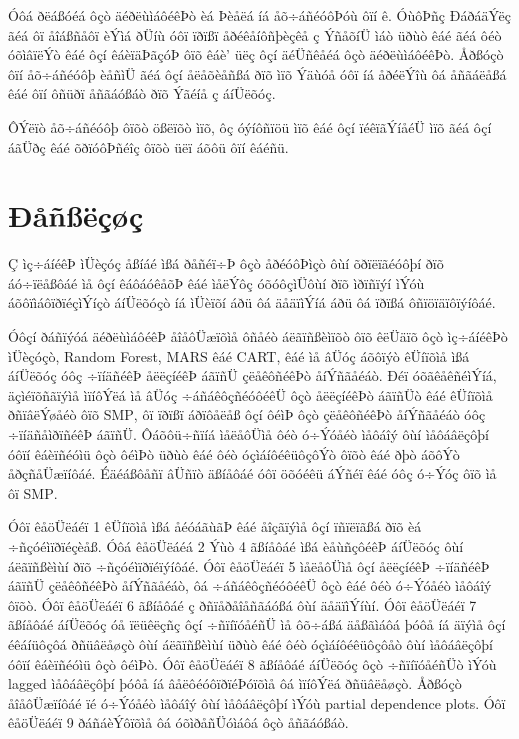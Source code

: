 \documentclass[12pt, twoside, a4paper]{book}
\newcommand{\tl}[1]{\textlatin{#1}}
\begin{document}
Óôá ðëáßóéá ôçò äéðëùìáôéêÞò èá Þèåëá íá åõ÷áñéóôÞóù ôïí ê. ÓùôÞñç ÐáðáäÝëç ãéá ôï åîáßñåôï èÝìá ðÜíù óôï ïðïßï åðéêåíôñþèçêå ç ÝñåõíÜ ìáò üðùò êáé ãéá ôéò óõìâïëÝò êáé ôçí êáèïäÞãçóÞ ôïõ êáè' üëç ôçí äéÜñêåéá ôçò äéðëùìáôéêÞò. Åðßóçò ôïí åõ÷áñéóôþ èåñìÜ ãéá ôçí åëåõèåñßá ðïõ ìïõ Ýäùóå óôï íá åðéëÝîù ôá åñãáëåßá êáé ôïí ôñüðï åñãáóßáò ðïõ Ýãéíå ç áíÜëõóç.

ÔÝëïò åõ÷áñéóôþ ôïõò ößëïõò ìïõ, ôç óýíôñïöü ìïõ êáé ôçí ïéêïãÝíåéÜ ìïõ ãéá ôçí áãÜðç êáé õðïóôÞñéîç ôïõò üëï áõôü ôïí êáéñü.

\newpage
\thispagestyle{empty}
\chapter*{Ðåñßëçøç}

Ç ìç÷áíéêÞ ìÜèçóç åßíáé ìßá ðåñéï÷Þ ôçò åðéóôÞìçò ôùí õðïëïãéóôþí ðïõ áó÷ïëåßôáé ìå ôçí êáôáóêåõÞ êáé ìåëÝôç óõóôçìÜôùí ðïõ ìðïñïýí ìÝóù áõôïìáôïðïéçìÝíçò áíÜëõóçò íá ìÜèïõí áðü ôá äåäïìÝíá áðü ôá ïðïßá ôñïöïäïôïýíôáé. 

Óôçí ðáñïýóá äéðëùìáôéêÞ åîåôÜæïõìå ôñåéò áëãïñßèìïõò ôïõ êëÜäïõ ôçò ìç÷áíéêÞò ìÜèçóçò, \tl{Random Forest}, \tl{MARS} êáé \tl{CART}, êáé ìå âÜóç áõôïýò êÜíïõìå ìßá áíÜëõóç óôç ÷ïíäñéêÞ åëëçíéêÞ áãïñÜ çëåêôñéêÞò åíÝñãåéáò. Ðéï óõãêåêñéìÝíá, äçìéïõñãïýìå ìïíôÝëá ìå âÜóç ÷áñáêôçñéóôéêÜ ôçò åëëçíéêÞò áãïñÜò êáé êÜíïõìå ðñïâëÝøåéò ôïõ \tl{SMP}, ôï ïðïßï áðïôåëåß ôçí ôéìÞ ôçò çëåêôñéêÞò åíÝñãåéáò óôç ÷ïíäñåìðïñéêÞ áãïñÜ. Ôáõôü÷ñïíá ìåëåôÜìå ôéò ó÷Ýóåéò ìåôáîý ôùí ìåôáâëçôþí óôïí êáèïñéóìü ôçò ôéìÞò üðùò êáé ôéò óçìáíôéêüôçôÝò ôïõò êáé ðþò áõôÝò åðçñåÜæïíôáé. Éäéáßôåñï âÜñïò äßíåôáé óôï öõóéêü áÝñéï êáé óôç ó÷Ýóç ôïõ ìå ôï \tl{SMP}.

Óôï êåöÜëáéï 1 êÜíïõìå ìßá åéóáãùãÞ êáé åîçãïýìå ôçí ïñïëïãßá ðïõ èá ÷ñçóéìïðïéçèåß. Óôá êåöÜëáéá 2 Ýùò 4 ãßíåôáé ìßá èåùñçôéêÞ áíÜëõóç ôùí áëãïñßèìùí ðïõ ÷ñçóéìïðïéïýíôáé. Óôï êåöÜëáéï 5 ìåëåôÜìå ôçí åëëçíéêÞ ÷ïíäñéêÞ áãïñÜ çëåêôñéêÞò åíÝñãåéáò, ôá ÷áñáêôçñéóôéêÜ ôçò êáé ôéò ó÷Ýóåéò ìåôáîý ôïõò. Óôï êåöÜëáéï 6 ãßíåôáé ç ðñïåðåîåñãáóßá ôùí äåäïìÝíùí. Óôï êåöÜëáéï 7 ãßíåôáé áíÜëõóç óå ïëüêëçñç ôçí ÷ñïíïóåéñÜ ìå ôõ÷áßá äåßãìáôá þóôå íá äïýìå ôçí éêáíüôçôá ðñüâëåøçò ôùí áëãïñßèìùí üðùò êáé ôéò óçìáíôéêüôçôåò ôùí ìåôáâëçôþí óôïí êáèïñéóìü ôçò ôéìÞò. Óôï êåöÜëáéï 8 ãßíåôáé áíÜëõóç ôçò ÷ñïíïóåéñÜò ìÝóù \tl{lagged} ìåôáâëçôþí þóôå íá âåëôéóôïðïéÞóïõìå ôá ìïíôÝëá ðñüâëåøçò. Åðßóçò åîåôÜæïíôáé ïé ó÷Ýóåéò ìåôáîý ôùí ìåôáâëçôþí ìÝóù \tl{partial dependence plots}. Óôï êåöÜëáéï 9 ðáñáèÝôïõìå ôá óõìðåñÜóìáôá ôçò åñãáóßáò.
\end{document}
